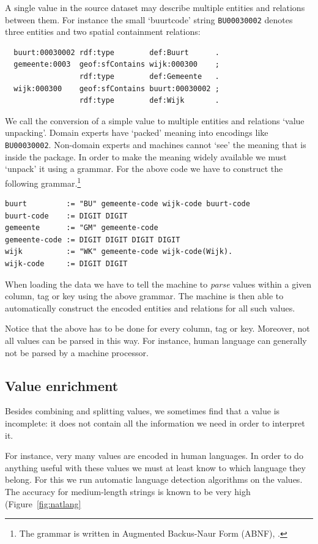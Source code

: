 \documentclass[a4paper]{scrartcl}
\newcommand{\textt}[1]{{\small \texttt{#1}}}
\begin{document}
A single value in the source dataset may describe multiple entities
and relations between them.  For instance the small `buurtcode' string
\textt{BU00030002} denotes three entities and two spatial containment
relations:

\begin{verbatim}
  buurt:00030002 rdf:type        def:Buurt      .
  gemeente:0003  geof:sfContains wijk:000300    ;
                 rdf:type        def:Gemeente   .
  wijk:000300    geof:sfContains buurt:00030002 ;
                 rdf:type        def:Wijk       .
\end{verbatim}

We call the conversion of a simple value to multiple entities and
relations `value unpacking'.  Domain experts have `packed' meaning
into encodings like \texttt{BU00030002}.  Non-domain experts and
machines cannot `see' the meaning that is inside the package.  In
order to make the meaning widely available we must `unpack' it using a
grammar.  For the above code we have to construct the following
grammar.\footnote{The grammar is written in Augmented Backus-Naur Form
  (ABNF), \cite{abnf}.}

\begin{verbatim}
buurt         := "BU" gemeente-code wijk-code buurt-code
buurt-code    := DIGIT DIGIT
gemeente      := "GM" gemeente-code
gemeente-code := DIGIT DIGIT DIGIT DIGIT
wijk          := "WK" gemeente-code wijk-code(Wijk).
wijk-code     := DIGIT DIGIT
\end{verbatim}

When loading the data we have to tell the machine to \emph{parse}
values within a given column, tag or key using the above grammar.  The
machine is then able to automatically construct the encoded entities
and relations for all such values.

Notice that the above has to be done for every column, tag or key.
Moreover, not all values can be parsed in this way.  For instance,
human language can generally not be parsed by a machine processor.


\subsection{Value enrichment}

Besides combining and splitting values, we sometimes find that a value
is incomplete: it does not contain all the information we need in
order to interpret it.

For instance, very many values are encoded in human languages.  In
order to do anything useful with these values we must at least know to
which language they belong.  For this we run automatic language
detection algorithms on the values.  The accuracy for medium-length
strings is known to be very high (Figure~\ref{fig:natlang}
\end{document}
